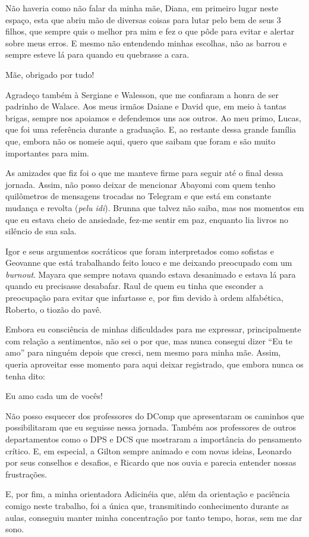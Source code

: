 \begin{agradecimentos}

Não haveria como não falar da minha mãe, Diana, em primeiro lugar neste espaço,
esta que abriu mão de diversas coisas para lutar pelo bem de seus 3 filhos, que sempre quis o melhor
pra mim e fez o que pôde para evitar e alertar sobre meus erros. E mesmo não entendendo minhas escolhas,
não as barrou e sempre esteve lá para quando eu quebrasse a cara.

Mãe, obrigado por tudo!

Agradeço também à Sergiane e Walesson, que me confiaram a honra de ser padrinho de Walace.
Aos meus irmãos Daiane e David que, em meio à tantas brigas, sempre nos apoiamos e defendemos uns aos outros.
Ao meu primo, Lucas, que foi uma referência durante a graduação. E, ao restante dessa grande família que, embora
não os nomeie aqui, quero que saibam que foram e são muito importantes para mim.

As amizades que fiz foi o que me manteve firme para seguir até o final dessa jornada. Assim, não posso deixar de mencionar
Abayomi com quem tenho quilômetros de mensagens trocadas no Telegram e que está em constante mudança e revolta (\emph{pelu idi}).
Brunna que talvez não saiba, mas nos momentos em que eu estava cheio de ansiedade, fez-me sentir em paz,
enquanto lia livros no silêncio de sua sala.

Igor e seus argumentos socráticos que foram interpretados como sofistas e Geovanne que está trabalhando feito louco e
me deixando preocupado com um \emph{burnout}. Mayara que sempre notava quando estava desanimado e estava lá para quando
eu precisasse desabafar. Raul de quem eu tinha que esconder a preocupação para evitar que infartasse e, por fim devido
à ordem alfabética, Roberto, o tiozão do pavê.

Embora eu consciência de minhas dificuldades para me expressar, principalmente com relação a sentimentos,
não sei o por que, mas nunca consegui dizer ``Eu te amo'' para ninguém depois que cresci, nem mesmo para minha mãe.
Assim, queria aproveitar esse momento para aqui deixar registrado, que embora nunca os tenha dito:

Eu amo cada um de vocês!

Não posso esquecer dos professores do DComp que apresentaram os caminhos que possibilitaram que eu seguisse nessa jornada.
Também aos professores de outros departamentos como o DPS e DCS que mostraram a importância do pensamento crítico.
E, em especial, a Gilton sempre animado e com novas ideias, Leonardo por seus conselhos e desafios, e Ricardo que nos ouvia
e parecia entender nossas frustrações.

E, por fim, a minha orientadora Adicinéia que, além da orientação e paciência comigo neste trabalho,
foi a única que, transmitindo conhecimento durante as aulas, conseguiu manter minha concentração por tanto tempo,
horas, sem me dar sono.

\end{agradecimentos}

